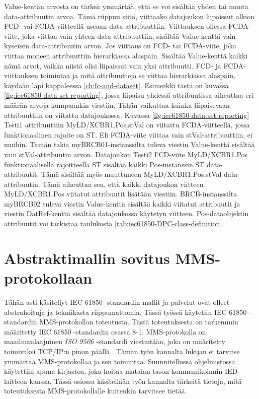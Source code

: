 Value-kentän arvosta on tärkeä ymmärtää, että se voi sisältää yhden tai monta data-att\-ri\-buu\-tin arvoa. Tämä riippuu siitä, viittaako datajoukon liipaissut alkion FCD- vai FCDA-viitteellä useaan data-attribuuttiin. Viittauksen ollessa FCDA-viite, joka viittaa vain yhteen data-attribuuttiin, sisältää Value-kenttä vain kyseisen data-attribuutin arvon. Jos viittaus on FCD- tai FCDA-viite, joka viittaa moneen attribuuttiin hierarkiassa alaspäin. Sisältää Value-kenttä kaikki nämä arvot, vaikka niistä olisi liipaissut vain yksi attribuutti. FCD- ja FCDA-viittauksen toimintaa ja mitä attribuutteja se viittaa hierarkiassa alaspäin, käydään läpi kappaleessa \ref{ch:fc-and-dataset}. Esimerkki tästä on kuvassa \ref{fig:iec61850-data-set-reporting}, jossa liipaisu yhdessä attribuutissa aiheuttaa eri määrän arvoja kumpaankin viestiin. Tähän vaikuttaa kuinka liipaisevaan attribuuttiin on viitattu datajoukossa. Kuvassa \ref{fig:iec61850-data-set-reporting} Testi1 attribuuttiin My\-LD\-/\-XCBR1\-.\-Pos\-.\-st\-Val on viitattu FCDA-viitteellä, jossa funktionaalinen rajoite on ST. Eli FCDA-viite viittaa vain stVal-attribuuttiin, ei muihin. Tämän takia myBRCB01-instanssilta tuleva viestin Value-kenttä sisältää vain stVal-attribuutin arvon. Datajoukon Testi2 FCD-viite My\-LD\-/\-XCBR1\-.\-Pos funktionaalisella rajoitteella ST sisältää kaikki Pos-instanssin ST data-attribuutit. Tämä sisältää myös muuttuneen MyLD/XCBR1.Pos.stVal data-attribuutin. Tämä aiheuttaa sen, että kaikki datajoukon viitteen My\-LD\-/\-XCBR1\-.\-Pos viitatut attribuutit lisätään viestiin. BRCB-instanssilta myBRCB02 tuleva viestin Value-kenttä sisältää kaikki viitatut attribuutit ja viestin DatRef-kenttä sisältää datajoukossa käytetyn viitteen. Pos-dataobjektin attribuutit voi tarkistaa taulukosta \ref{tab:iec61850-DPC-class-definition}. \mbox{\cite[s.~40--44]{IEC61850-7-1}} \mbox{\cite[s.~108]{IEC61850-7-2}}


\section{Abstraktimallin sovitus MMS-protokollaan}
\label{ch:iec61850-mms-mallinnus}
Tähän asti käsitellyt IEC 61850 -standardin mallit ja palvelut ovat olleet abstrahoituja ja tekniikasta riippumattomia. Tässä työssä käytetiin IEC 61850 -standardin MMS-protokollan toteutusta. Tästä toteutuksesta on tarkemmin määritetty IEC 61850 -stan\-dar\-din osassa 8-1. MMS-protokolla on maailmanlaajuinen \emph{ISO 9506} -standardi viestintään, joka on määritetty toimivaksi TCP/IP:n pinon päällä \mbox{\cite{MMS-protocol-stack-and-API}}. Tämän työn kannalta lukijan ei tarvitse ymmärtää MMS-protokollaa ja sen toimintaa. Suunnitellussa ohjelmistossa käytettiin apuna kirjastoa, joka hoitaa matalan tason kommunikoinnin IED-laitteen kanssa. Tässä osiossa käsitellään työn kannalta tärkeitä tietoja, mitä toteutuksesta MMS-protokollalle kuitenkin tarvitsee tietää. \mbox{\cite{Introduction-to-the-MMS}}

